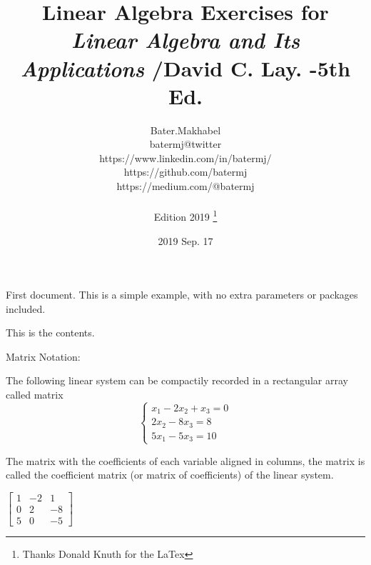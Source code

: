 \documentclass[12pt, letterpaper]{book}
\title{Linear Algebra Exercises for \emph{Linear Algebra and Its Applications} /David C. Lay. -5th Ed.}
\author{Bater.Makhabel \\batermj@twitter 
\\https://www.linkedin.com/in/batermj/ \\https://github.com/batermj \\https://medium.com/@batermj \\\\Edition 2019 \thanks{Thanks Donald Knuth for the LaTex}}
\date{2019 Sep. 17}
\begin{document}
\begin{titlepage}
\thispagestyle{empty} 
\end{titlepage}

\tableofcontents

First document. This is a simple example, with no 
extra parameters or packages included.

\begin{comment}
This text won't show up in the compiled pdf
this is just a multi-line comment. Useful
to, for instance, comment out slow-rendering
while working on the draft.
\end{comment}

\newpage
This is the contents.

\setcounter{page}{1} 

\newpage
Matrix Notation:

The following linear system can be compactily recorded in a rectangular array called matrix
\begin{equation}
\left\{
\begin{array}{l}
x_{1} - 2x_{2} + x_{3}  = 0\\
2x_{2} - 8x_{3} = 8\\
5x_{1} - 5x_{3} = 10
\end{array}
\right. 
\end{equation}



The matrix with the coefficients of each variable aligned in columns, the matrix is called the coefficient matrix (or matrix of coefficients) of the linear system.

$\begin{bmatrix} 1 & -2 & 1 \\ 0 & 2 & -8 \\ 5 & 0 & -5 
\end{bmatrix}$
\end{document}
